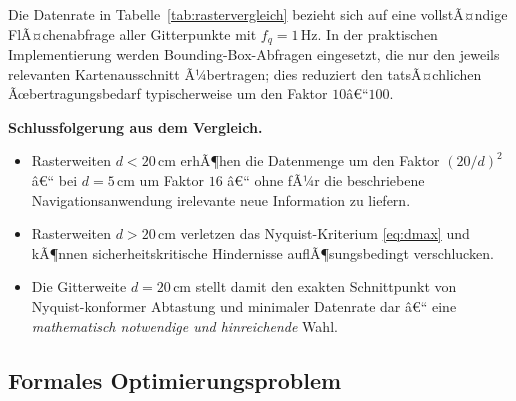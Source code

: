 ﻿\documentclass[a4paper,12pt]{article}
\theoremstyle{definition}
\begin{document}
\noindent
Die Datenrate in Tabelle~\ref{tab:rastervergleich} bezieht sich auf eine
vollstÃ¤ndige FlÃ¤chenabfrage aller Gitterpunkte mit $f_q = 1\,\text{Hz}$.
In der praktischen Implementierung werden Bounding-Box-Abfragen eingesetzt,
die nur den jeweils relevanten Kartenausschnitt Ã¼bertragen; dies reduziert
den tatsÃ¤chlichen Ãœbertragungsbedarf typischerweise um den Faktor
$10$â€“$100$.

\medskip\noindent
\textbf{Schlussfolgerung aus dem Vergleich.}
\begin{itemize}
  \item Rasterweiten $d < 20\,\text{cm}$ erhÃ¶hen die Datenmenge um den Faktor
        $(20/d)^2$ â€“ bei $d = 5\,\text{cm}$ um Faktor $16$
        â€“ ohne fÃ¼r die beschriebene Navigationsanwendung
        irelevante neue Information zu liefern.
  \item Rasterweiten $d > 20\,\text{cm}$ verletzen das Nyquist-Kriterium
        \eqref{eq:dmax} und kÃ¶nnen sicherheitskritische Hindernisse
        auflÃ¶sungsbedingt verschlucken.
  \item Die Gitterweite $d = 20\,\text{cm}$ stellt damit den exakten
        Schnittpunkt von Nyquist-konformer Abtastung und minimaler
        Datenrate dar â€“ eine \emph{mathematisch notwendige und
        hinreichende} Wahl.
\end{itemize}

\subsection{Formales Optimierungsproblem}
\end{document}
